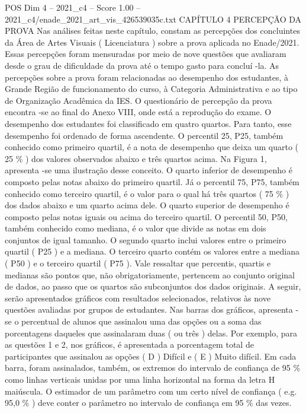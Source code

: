 \begin{textsample}{POS Dim 4 – 2021\_c4 – Score 1.00 – 2021\_c4/enade\_2021\_art\_vis\_426539035c.txt}  \label{ex:f4_pos_138}
CAPÍTULO 4 PERCEPÇÃO DA PROVA Nas análises feitas neste capítulo, constam as percepções dos concluintes da Área de Artes Visuais ( Licenciatura ) sobre a prova aplicada no Enade/2021.
Essas percepções foram mensuradas por meio de nove questões que avaliaram desde o grau de dificuldade da prova até o tempo gasto para concluí -la.
As percepções sobre a prova foram relacionadas ao desempenho dos estudantes, à Grande Região de funcionamento do curso, à Categoria Administrativa e ao tipo de Organização Acadêmica da IES.
O questionário de percepção da prova encontra -se ao final do Anexo VIII, onde está a reprodução do exame.
O desempenho dos estudantes foi classificado em quatro quartos.
Para tanto, esse desempenho foi ordenado de forma ascendente.
O percentil 25, P25, também conhecido como primeiro quartil, é a nota de desempenho que deixa um quarto ( 25 \% ) dos valores observados abaixo e três quartos acima.
Na Figura 1, apresenta -se uma ilustração desse conceito.
O quarto inferior de desempenho é composto pelas notas abaixo do primeiro quartil.
Já o percentil 75, P75, também conhecido como terceiro quartil, é o valor para o qual há três quartos ( 75 \% ) dos dados abaixo e um quarto acima dele.
O quarto superior de desempenho é composto pelas notas iguais ou acima do terceiro quartil.
O percentil 50, P50, também conhecido como mediana, é o valor que divide as notas em dois conjuntos de igual tamanho.
O segundo quarto inclui valores entre o primeiro quartil ( P25 ) e a mediana.
O terceiro quarto contém os valores entre a mediana ( P50 ) e o terceiro quartil ( P75 ).
Vale ressaltar que percentis, quartis e medianas são pontos que, não obrigatoriamente, pertencem ao conjunto original de dados, ao passo que os quartos são subconjuntos dos dados originais.
A seguir, serão apresentados gráficos com resultados selecionados, relativos às nove questões avaliadas por grupos de estudantes.
Nas barras dos gráficos, apresenta -se o percentual de alunos que assinalou uma das opções ou a soma das porcentagens daqueles que assinalaram duas ( ou três ) delas.
Por exemplo, para as questões 1 e 2, nos gráficos, é apresentada a porcentagem total de participantes que assinalou as opções ( D ) Difícil e ( E ) Muito difícil.
Em cada barra, foram assinalados, também, os extremos do intervalo de confiança de 95 \% como linhas verticais unidas por uma linha horizontal na forma da letra H maiúscula.
O estimador de um parâmetro com um certo nível de confiança ( e.g. 95,0 \% ) deve conter o parâmetro no intervalo de confiança em 95 \% das vezes.

\end{textsample}

